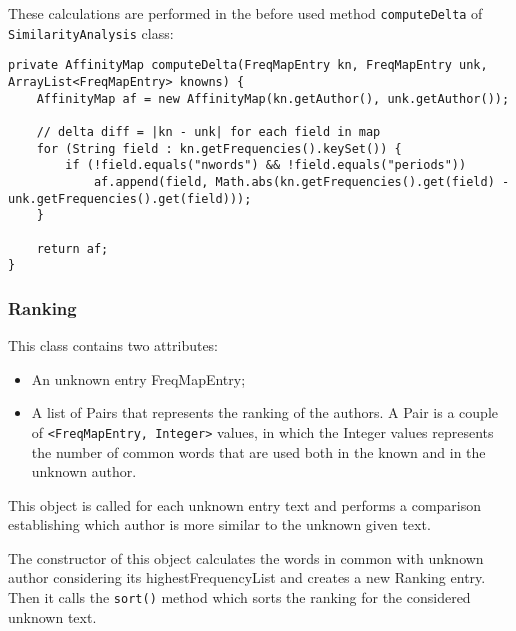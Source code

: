 \documentclass[a4paper,11pt, twoside]{article}
\begin{document}
	\noindent
	These calculations are performed in the before used method \lstinline|computeDelta| of \lstinline|SimilarityAnalysis| class:
	\begin{lstlisting}[firstnumber=104,caption={SimilarityAnalysis computeDelta method}, captionpos=b, label={lst:computeDelta}]
private AffinityMap computeDelta(FreqMapEntry kn, FreqMapEntry unk, ArrayList<FreqMapEntry> knowns) {
	AffinityMap af = new AffinityMap(kn.getAuthor(), unk.getAuthor());

	// delta diff = |kn - unk| for each field in map
	for (String field : kn.getFrequencies().keySet()) {
		if (!field.equals("nwords") && !field.equals("periods"))
			af.append(field, Math.abs(kn.getFrequencies().get(field) - unk.getFrequencies().get(field)));
	}

	return af;
}
	\end{lstlisting}
	
		\subsubsection{Ranking}
		This class contains two attributes:
		\begin{itemize}
			\item An unknown entry FreqMapEntry;
			\item A list of Pairs that represents the ranking of the authors. A Pair is a couple of \lstinline|<FreqMapEntry, Integer>| values, in which the Integer values represents the number of common words that are used both in the known and in the unknown author.
		\end{itemize}
		This object is called for each unknown entry text and performs a comparison establishing which author is more similar to the unknown given text.

		\bigskip
		\noindent
		The constructor of this object calculates the words in common with unknown author considering its highestFrequencyList and creates a new Ranking entry. Then it calls the \lstinline|sort()| method which sorts the ranking for the considered unknown text.
		
\end{document}
